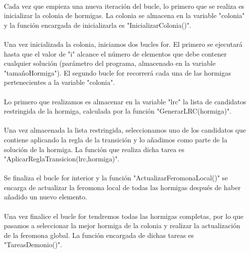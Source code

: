 	\paragraph{}Cada vez que empieza una nueva iteración del bucle, lo primero que se realiza es inicializar la colonia de hormigas. La colonia se almacena en la variable "colonia" y la función encargada de inicializarla es "InicializarColonia()".
	
	\paragraph{}Una vez inicializada la colonia, iniciamos dos bucles for. El primero se ejecutará hasta que el valor de "i" alcance el número de elementos que debe contener cualquier solución (parámetro del programa, almacenado en la variable "tamañoHormiga"). El segundo bucle for recorrerá cada una de las hormigas pertenecientes a la variable "colonia".
	
	\paragraph{}Lo primero que realizamos es almacenar en la variable "lrc" la lista de candidatos restringida de la hormiga, calculada por la función "GenerarLRC(hormiga)".
	
	\paragraph{}Una vez almacenada la lista restringida, seleccionamos uno de los candidatos que contiene aplicando la regla de la transición y lo añadimos como parte de la solución de la hormiga. La función que realiza dicha tarea es "AplicarReglaTransicion(lrc,hormiga)".
	
	\paragraph{}Se finaliza el bucle for interior y la función "ActualizarFeromonaLocal()" se encarga de actualizar la feromona local de todas las hormigas después de haber añadido un nuevo elemento.
	
	\paragraph{}Una vez finalice el bucle for tendremos todas las hormigas completas, por lo que pasamos a seleccionar la mejor hormiga de la colonia y realizar la actualización de la feromona global. La función encargada de dichas tareas es "TareasDemonio()".
	
